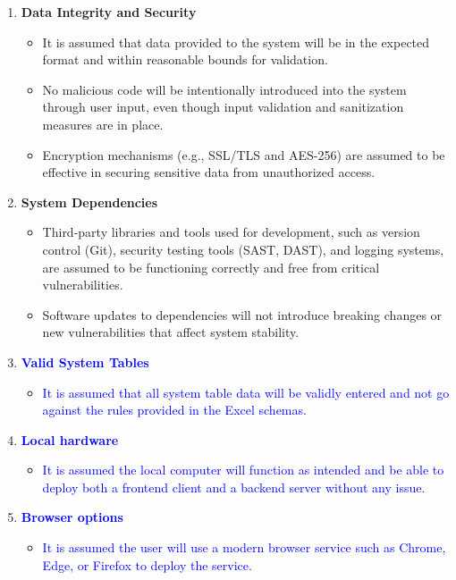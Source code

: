 \documentclass{article}
\begin{document}
\begin{enumerate}
    \item \textbf{Data Integrity and Security}
    \begin{itemize}
        \item It is assumed that data provided to the system will be in the expected format and within reasonable bounds for validation.
        \item No malicious code will be intentionally introduced into the system through user input, even though input validation and sanitization measures are in place.
        \item Encryption mechanisms (e.g., SSL/TLS and AES-256) are assumed to be effective in securing sensitive data from unauthorized access.
    \end{itemize}
    
    \item \textbf{System Dependencies}
    \begin{itemize}
        \item Third-party libraries and tools used for development, such as version control (Git), security testing tools (SAST, DAST), and logging systems, are assumed to be functioning correctly and free from critical vulnerabilities.
        \item Software updates to dependencies will not introduce breaking changes or new vulnerabilities that affect system stability.
    \end{itemize}

    \item \textbf{\textcolor{blue}{Valid System Tables}}
    \begin{itemize}
        \item \textcolor{blue}{It is assumed that all system table data will be validly entered and not go against the rules provided in the Excel schemas.}
    \end{itemize}

    \item \textbf{\textcolor{blue}{Local hardware}}
    \begin{itemize}
        \item \textcolor{blue}{It is assumed the local computer will function as intended and be able to deploy both a frontend client and a backend server without any issue.}
    \end{itemize}

    \item \textbf{\textcolor{blue}{Browser options}}
    \begin{itemize}
        \item \textcolor{blue}{It is assumed the user will use a modern browser service such as Chrome, Edge, or Firefox to deploy the service.}
    \end{itemize}



    
\end{enumerate}
\end{document}
